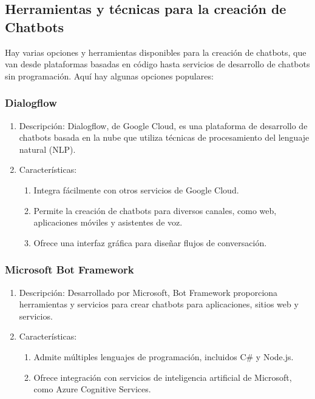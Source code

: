 \subsection{Herramientas y técnicas para la creación de Chatbots}

Hay varias opciones y herramientas disponibles para la creación de chatbots, que van desde plataformas basadas en código hasta servicios de desarrollo de chatbots sin programación. Aquí hay algunas opciones populares:

\subsubsection{Dialogflow}
\begin{enumerate}
\item Descripción: Dialogflow, de Google Cloud, es una plataforma de desarrollo de chatbots basada en la nube que utiliza técnicas de procesamiento del lenguaje natural (NLP).
\item Características:
\begin{enumerate}
\item Integra fácilmente con otros servicios de Google Cloud.
\item Permite la creación de chatbots para diversos canales, como web, aplicaciones móviles y asistentes de voz.
\item Ofrece una interfaz gráfica para diseñar flujos de conversación.
\end{enumerate}
\end{enumerate}

\subsubsection{Microsoft Bot Framework}
\begin{enumerate}
\item Descripción: Desarrollado por Microsoft, Bot Framework proporciona herramientas y servicios para crear chatbots para aplicaciones, sitios web y servicios.
\item Características:
\begin{enumerate}
\item Admite múltiples lenguajes de programación, incluidos C\# y Node.js.
\item Ofrece integración con servicios de inteligencia artificial de Microsoft, como Azure Cognitive Services.
\end{enumerate}
\end{enumerate}

